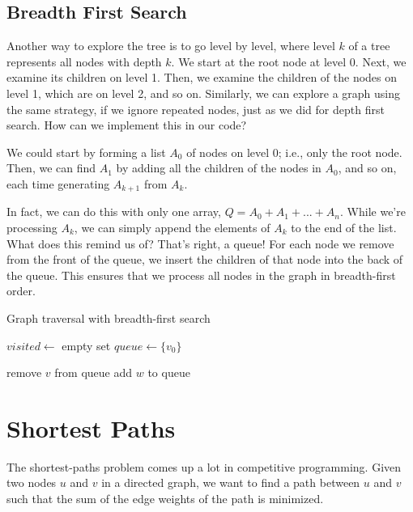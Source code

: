 \subsection{Breadth First Search}

Another way to explore the tree is to go level by level, where level $k$ of a tree represents all nodes with depth $k$. We start at the root node at level 0. Next, we examine its children on level 1. Then, we examine the children of the nodes on level 1, which are on level 2, and so on. Similarly, we can explore a graph using the same strategy, if we ignore repeated nodes, just as we did for depth first search. How can we implement this in our code?

We could start by forming a list $A_0$ of nodes on level 0; i.e., only the root node. Then, we can find $A_1$ by adding all the children of the nodes in $A_0$, and so on, each time generating $A_{k+1}$ from $A_k$.

In fact, we can do this with only one array, $Q = A_0 + A_1 + ... + A_n$. While we're processing $A_k$, we can simply append the elements of $A_k$ to the end of the list. What does this remind us of? That's right, a queue! For each node we remove from the front of the queue, we insert the children of that node into the back of the queue. This ensures that we process all nodes in the graph in breadth-first order.

\begin{algorithm}[H]
\caption{Graph traversal with breadth-first search}
\begin{algorithmic}

    \State $visited \gets$ empty set
    \State $queue \gets \{v_0\}$

        \State remove $v$ from queue
                \State add $w$ to queue
            \EndIf
        \EndFor
    \EndWhile
\EndFunction

\end{algorithmic}
\end{algorithm}


\section{Shortest Paths}

The shortest-paths problem comes up a lot in competitive programming. Given two nodes $u$ and $v$ in a directed graph, we want to find a path between $u$ and $v$ such that the sum of the edge weights of the path is minimized.

